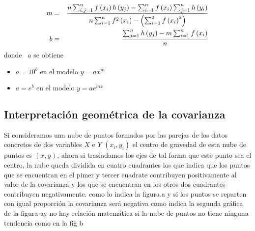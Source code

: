 \documentclass[12pt]{article}
\begin{document}
\begin{eqnarray*}
m &=&\frac{n\sum_{i.j=1}^{n}f\left( x_{i}\right) h\left( y_{j}\right)
-\sum_{i=1}^{n}f\left( x_{i}\right) \sum_{j=1}^{n}h\left( y_{i}\right) }{%
n\sum_{i=1}^{n}f^{2}\left( x_{i}\right) -\left( \sum_{i=1}^{2}f\left(
x_{i}\right) ^{2}\right) } \\
b &=&\frac{\sum_{j=1}^{n}h\left( y_{j}\right) -m\sum_{i=1}^{n}f\left(
x_{i}\right) }{n}
\end{eqnarray*}
donde \ $a$ se obtiene

\begin{itemize}
\item  $a=10^{b}$ en el modelo $y=ax^{m}$

\item  $a=e^{b}$ en el modelo $y=ae^{mx}$
\end{itemize}

\subsection{Interpretaci\'{o}n geom\'{e}trica de la covarianza}

Si consideramos una nube de puntos formados por las parejas de los datos
concretos de dos variables $X$ e $Y$ $\left( x_{i},y_{i}\right) $ el centro
de gravedad de esta nube de puntos es $\left( \overset{-}{x},\overset{-}{y}%
\right) $, ahora si trasladamos los ejes de tal forma que este punto sea el
centro, la nube queda dividida en cuatro cuadrantes los que indica que los
puntos que se encuentran en el pimer y tercer cuadrate contribuyen
positivamente al valor de la covarianza y los que se encuentran en los otros
dos cuadrantes contribuyen negativamente. como lo indica la figura.a y si
los puntos se reparten con igual proporci\'{o}n la covarianza ser\'{a}
negativa como indica la segunda gr\'{a}fica de la figura ay no hay relaci\'{o}n matem\'{a}tica si la nube de puntos no tiene ninguna
tendencia como en la fig b
\end{document}
